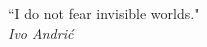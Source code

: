 
\clearpage

\narrowlinespacing

\vspace*{4mm}
``I do not fear invisible worlds."\\
\emph{Ivo Andri\' c}


\normallinespacing
